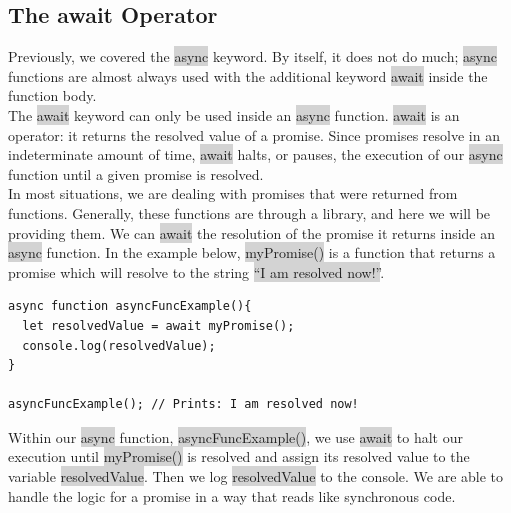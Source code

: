 \documentclass[11pt]{article}
\begin{document}
\subsection{The await Operator}
Previously, we covered the \colorbox{lightgray}{async} keyword. By itself, it does not do much; \colorbox{lightgray}{async} functions are almost always used with the additional keyword \colorbox{lightgray}{await} inside the function body. \\
\newline
The \colorbox{lightgray}{await} keyword can only be used inside an \colorbox{lightgray}{async} function. \colorbox{lightgray}{await} is an operator: it returns the resolved value of a promise. Since promises resolve in an indeterminate amount of time, \colorbox{lightgray}{await} halts, or pauses, the execution of our \colorbox{lightgray}{async} function until a given promise is resolved. \\
\newline
In most situations, we are dealing with promises that were returned from functions. Generally, these functions are through a library, and here we will be providing them. We can \colorbox{lightgray}{await} the resolution of the promise it returns inside an \colorbox{lightgray}{async} function. In the example below, \colorbox{lightgray}{myPromise()} is a function that returns a promise which will resolve to the string \colorbox{lightgray}{``I am resolved now!''}.
\begin{lstlisting}
async function asyncFuncExample(){
  let resolvedValue = await myPromise();
  console.log(resolvedValue);
}

asyncFuncExample(); // Prints: I am resolved now!
\end{lstlisting}
Within our \colorbox{lightgray}{async} function, \colorbox{lightgray}{asyncFuncExample()}, we use \colorbox{lightgray}{await} to halt our execution until \colorbox{lightgray}{myPromise()} is resolved and assign its resolved value to the variable \colorbox{lightgray}{resolvedValue}. Then we log \colorbox{lightgray}{resolvedValue} to the console. We are able to handle the logic for a promise in a way that reads like synchronous code.
\end{document}
